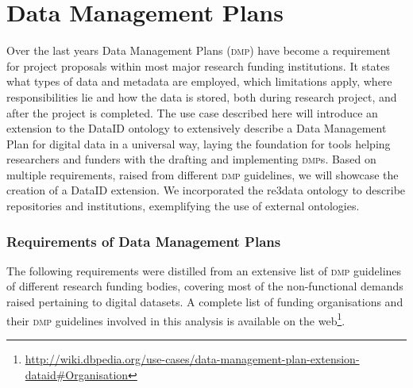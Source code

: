 \documentclass[runningheads,a4paper]{llncs}
\newcommand{\dmp}{{\scshape dmp}\xspace}
\newcommand\footnoteurl[1]{\footnote{\scriptsize\url{#1}}}
\begin{document}
\section{Data Management Plans}
\label{dmps}
Over the last years Data Management Plans (\dmp) have become a requirement for project proposals within most major research funding institutions. It states what types of data and metadata are employed, which limitations apply, where responsibilities lie and how the data is stored, both during research project, and after the project is completed.
The use case described here will introduce an extension to the DataID ontology to extensively describe a Data Management Plan for digital data in a universal way, laying the foundation for tools helping researchers and funders with the drafting and implementing \dmp{}s. %
Based on multiple requirements, raised from different \dmp guidelines, we will showcase the creation of a DataID extension. We incorporated the re3data ontology to describe repositories and institutions, exemplifying the use of external ontologies.

\subsubsection{Requirements of Data Management Plans}
\label{requDmp}
The following requirements were distilled from an extensive list of \dmp guidelines of different research funding bodies,
covering most of the non-functional demands raised pertaining to digital datasets. A complete list of funding organisations and their \dmp guidelines involved in this analysis is available on the web\footnoteurl{http://wiki.dbpedia.org/use-cases/data-management-plan-extension-dataid\#Organisation}. 
\end{document}
